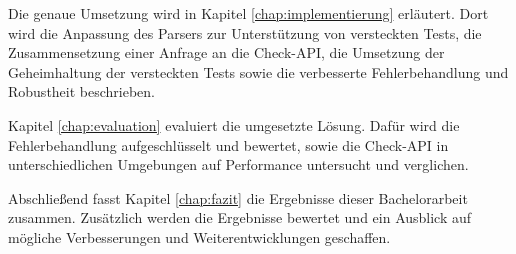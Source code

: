 Die genaue Umsetzung wird in Kapitel \ref{chap:implementierung} erläutert. Dort wird die Anpassung des Parsers zur Unterstützung von versteckten Tests, die Zusammensetzung einer Anfrage an die Check-API, die Umsetzung der Geheimhaltung der versteckten Tests sowie die verbesserte Fehlerbehandlung und Robustheit beschrieben.

Kapitel \ref{chap:evaluation} evaluiert die umgesetzte Lösung. Dafür wird die Fehlerbehandlung aufgeschlüsselt und bewertet, sowie die Check-API in unterschiedlichen Umgebungen auf Performance untersucht und verglichen.

Abschließend fasst Kapitel \ref{chap:fazit} die Ergebnisse dieser Bachelorarbeit zusammen. Zusätzlich werden die Ergebnisse bewertet und ein Ausblick auf mögliche Verbesserungen und Weiterentwicklungen geschaffen.
